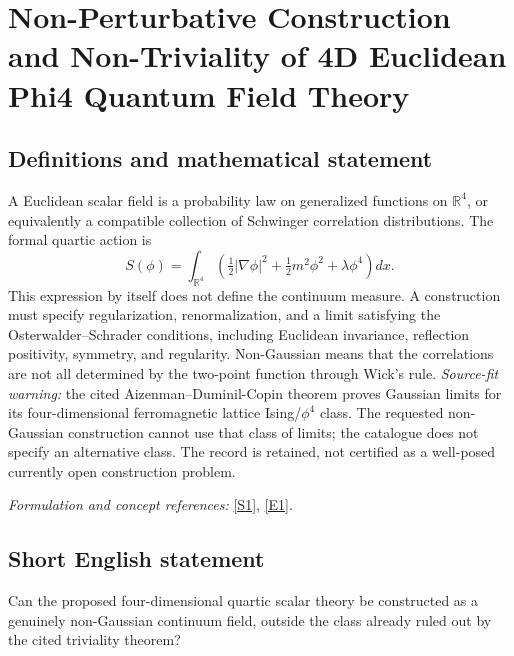 \documentclass[11pt]{article}
\newcommand{\R}{\mathbb{R}}
\newcommand{\sref}[2]{\hyperlink{source:#1:#2}{[S#2]}}
\newcommand{\eref}[2]{\hyperlink{extra:#1:#2}{[E#2]}}
\newif\ifshowcatalogue
\newcommand{\cataloguescope}[1]{\ifshowcatalogue
 \paragraph{Exact scope in the supplied catalogue.}
 \begin{quote}\small #1\end{quote}\fi}
\begin{document}
\setcounter{section}{0}
\clearpage
\section*{\texorpdfstring{Non-Perturbative Construction and Non-Triviality of 4D Euclidean Phi4 Quantum Field Theory}{Non-Perturbative Construction and Non-Triviality of 4D Euclidean Phi4 Quantum Field Theory}}\label{30006697}
\subsection{Definitions and mathematical statement}
A Euclidean scalar field is a probability law on generalized functions on $\R^4$, or equivalently a compatible collection of Schwinger correlation distributions. The formal quartic action is
\[
 S(\phi)=\int_{\R^4}\left(\tfrac12|\nabla\phi|^2+\tfrac12m^2\phi^2+\lambda\phi^4\right)dx.
\]
This expression by itself does not define the continuum measure. A construction must specify regularization, renormalization, and a limit satisfying the Osterwalder--Schrader conditions, including Euclidean invariance, reflection positivity, symmetry, and regularity. Non-Gaussian means that the correlations are not all determined by the two-point function through Wick's rule. \emph{Source-fit warning:} the cited Aizenman--Duminil-Copin theorem proves Gaussian limits for its four-dimensional ferromagnetic lattice Ising/$\phi^4$ class. The requested non-Gaussian construction cannot use that class of limits; the catalogue does not specify an alternative class. The record is retained, not certified as a well-posed currently open construction problem.
\par\smallskip\textit{Formulation and concept references:} \sref{30006697}{1}, \eref{30006697}{1}.
\cataloguescope{Construct a non-trivial, non-Gaussian Euclidean scalar quantum field theory with quartic interaction (phi\textasciicircum{}4)\_4 in four spacetime dimensions satisfying the Osterwalder-Schrader axioms.}
\subsection{Short English statement}
Can the proposed four-dimensional quartic scalar theory be constructed as a genuinely non-Gaussian continuum field, outside the class already ruled out by the cited triviality theorem?
\end{document}
